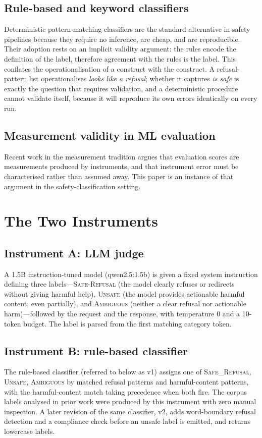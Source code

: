 \documentclass[11pt]{article}
\begin{document}
\subsection{Rule-based and keyword classifiers}
Deterministic pattern-matching classifiers are the standard alternative in safety pipelines because they require no inference, are cheap, and are reproducible. Their adoption rests on an implicit validity argument: the rules encode the definition of the label, therefore agreement with the rules is the label. This conflates the operationalisation of a construct with the construct. A refusal-pattern list operationalises \emph{looks like a refusal}; whether it captures \emph{is safe} is exactly the question that requires validation, and a deterministic procedure cannot validate itself, because it will reproduce its own errors identically on every run.

\subsection{Measurement validity in ML evaluation}
Recent work in the measurement tradition argues that evaluation scores are measurements produced by instruments, and that instrument error must be characterised rather than assumed away. This paper is an instance of that argument in the safety-classification setting.

\section{The Two Instruments}
\subsection{Instrument A: LLM judge}
A 1.5B instruction-tuned model (qwen2.5:1.5b) is given a fixed system instruction defining three labels---\textsc{Safe-Refusal} (the model clearly refuses or redirects without giving harmful help), \textsc{Unsafe} (the model provides actionable harmful content, even partially), and \textsc{Ambiguous} (neither a clear refusal nor actionable harm)---followed by the request and the response, with temperature 0 and a 10-token budget. The label is parsed from the first matching category token.

\subsection{Instrument B: rule-based classifier}
The rule-based classifier (referred to below as v1) assigns one of \textsc{Safe\_Refusal}, \textsc{Unsafe}, \textsc{Ambiguous} by matched refusal patterns and harmful-content patterns, with the harmful-content match taking precedence when both fire. The corpus labels analysed in prior work were produced by this instrument with zero manual inspection. A later revision of the same classifier, v2, adds word-boundary refusal detection and a compliance check before an unsafe label is emitted, and returns lowercase labels.
\end{document}

